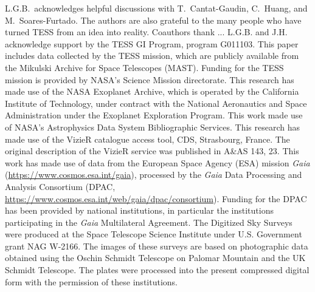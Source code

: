 \documentclass[12pt,twocolumn,tighten]{aastex62}
\begin{document}
\acknowledgements
L.G.B.\ acknowledges helpful discussions with 
T.~Cantat-Gaudin,
C.~Huang,
and M.~Soares-Furtado.  The authors are also
grateful to the many people who have turned TESS from an idea into
reality.
%
Coauthors thank ... %
%
L.G.B. and J.H. acknowledge support by the TESS GI Program, program
G011103.
%
This paper includes data collected by the TESS mission, which are
publicly available from the Mikulski Archive for Space Telescopes
(MAST).
%
Funding for the TESS mission is provided by NASA's Science Mission
directorate.
%
This research has made use of the NASA Exoplanet Archive, which is
operated by the California Institute of Technology, under contract
with the National Aeronautics and Space Administration under the
Exoplanet Exploration Program.
%
This work made use of NASA's Astrophysics Data System Bibliographic
Services.
%
This research has made use of the VizieR catalogue access tool, CDS,
Strasbourg, France. The original description of the VizieR service was
published in A\&AS 143, 23.
%
This work has made use of data from the European Space Agency (ESA)
mission {\it Gaia} (\url{https://www.cosmos.esa.int/gaia}), processed
by the {\it Gaia} Data Processing and Analysis Consortium (DPAC,
\url{https://www.cosmos.esa.int/web/gaia/dpac/consortium}). Funding
for the DPAC has been provided by national institutions, in particular
the institutions participating in the {\it Gaia} Multilateral
Agreement.
%
The Digitized Sky Surveys were produced at the Space Telescope Science
Institute under U.S. Government grant NAG W-2166. The images of these
surveys are based on photographic data obtained using the Oschin
Schmidt Telescope on Palomar Mountain and the UK Schmidt Telescope.
The plates were processed into the present compressed digital form
with the permission of these institutions.
%
\newline
%
%
\end{document}
